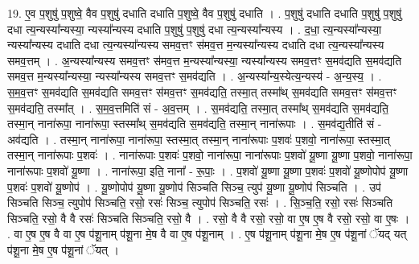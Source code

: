 \documentclass[17pt]{extarticle}
\begin{document}
19. ए॒व प॒शुषु॑ प॒शुष्वे॒ वैव प॒शुषु॑ दधाति दधाति प॒शुष्वे॒ वैव प॒शुषु॑ दधाति । . प॒शुषु॑ दधाति दधाति प॒शुषु॑ प॒शुषु॑ दधा त्य॒न्यस्या᳚न्यस्या॒ न्यस्या᳚न्यस्य दधाति प॒शुषु॑ प॒शुषु॑ दधा त्य॒न्यस्या᳚न्यस्य । . द॒धा॒ त्य॒न्यस्या᳚न्यस्या॒ न्यस्या᳚न्यस्य दधाति दधा त्य॒न्यस्या᳚न्यस्य समव॒त्तꣳ स॑मव॒त्त म॒न्यस्या᳚न्यस्य दधाति दधा त्य॒न्यस्या᳚न्यस्य समव॒त्तम् । . अ॒न्यस्या᳚न्यस्य समव॒त्तꣳ स॑मव॒त्त म॒न्यस्या᳚न्यस्या॒ न्यस्या᳚न्यस्य समव॒त्तꣳ स॒मव॑द्यति स॒मव॑द्यति समव॒त्त म॒न्यस्या᳚न्यस्या॒ न्यस्या᳚न्यस्य समव॒त्तꣳ स॒मव॑द्यति । . अ॒न्यस्या᳚न्य॒स्येत्य॒न्यस्य॑ - अ॒न्य॒स्य॒ । . स॒म॒व॒त्तꣳ स॒मव॑द्यति स॒मव॑द्यति समव॒त्तꣳ स॑मव॒त्तꣳ स॒मव॑द्यति॒ तस्मा॒त् तस्मा᳚थ् स॒मव॑द्यति समव॒त्तꣳ स॑मव॒त्तꣳ स॒मव॑द्यति॒ तस्मा᳚त् । . स॒म॒व॒त्तमिति॑ सं - अ॒व॒त्तम् । . स॒मव॑द्यति॒ तस्मा॒त् तस्मा᳚थ् स॒मव॑द्यति स॒मव॑द्यति॒ तस्मा॒न् नाना॑रूपा॒ नाना॑रूपा॒ स्तस्मा᳚थ् स॒मव॑द्यति स॒मव॑द्यति॒ तस्मा॒न् नाना॑रूपाः । . स॒मव॑द्य॒तीति॑ सं - अव॑द्यति । . तस्मा॒न् नाना॑रूपा॒ नाना॑रूपा॒ स्तस्मा॒त् तस्मा॒न् नाना॑रूपाः प॒शवः॑ प॒शवो॒ नाना॑रूपा॒ स्तस्मा॒त् तस्मा॒न् नाना॑रूपाः प॒शवः॑ । . नाना॑रूपाः प॒शवः॑ प॒शवो॒ नाना॑रूपा॒ नाना॑रूपाः प॒शवो॑ यू॒ष्णा यू॒ष्णा प॒शवो॒ नाना॑रूपा॒ नाना॑रूपाः प॒शवो॑ यू॒ष्णा । . नाना॑रूपा॒ इति॒ नाना᳚ - रू॒पाः॒ । . प॒शवो॑ यू॒ष्णा यू॒ष्णा प॒शवः॑ प॒शवो॑ यू॒ष्णोपोप॑ यू॒ष्णा प॒शवः॑ प॒शवो॑ यू॒ष्णोप॑ । . यू॒ष्णोपोप॑ यू॒ष्णा यू॒ष्णोप॑ सिञ्चति सिञ्च॒ त्युप॑ यू॒ष्णा यू॒ष्णोप॑ सिञ्चति । . उप॑ सिञ्चति सिञ्च॒ त्युपोप॑ सिञ्चति॒ रसो॒ रसः॑ सिञ्च॒ त्युपोप॑ सिञ्चति॒ रसः॑ । . सि॒ञ्च॒ति॒ रसो॒ रसः॑ सिञ्चति सिञ्चति॒ रसो॒ वै वै रसः॑ सिञ्चति सिञ्चति॒ रसो॒ वै । . रसो॒ वै वै रसो॒ रसो॒ वा ए॒ष ए॒ष वै रसो॒ रसो॒ वा ए॒षः । . वा ए॒ष ए॒ष वै वा ए॒ष प॑शू॒नाम् प॑शू॒ना मे॒ष वै वा ए॒ष प॑शू॒नाम् । . ए॒ष प॑शू॒नाम् प॑शू॒ना मे॒ष ए॒ष प॑शू॒नां ॅयद् यत् प॑शू॒ना मे॒ष ए॒ष प॑शू॒नां ॅयत् । \newline
\end{document}
